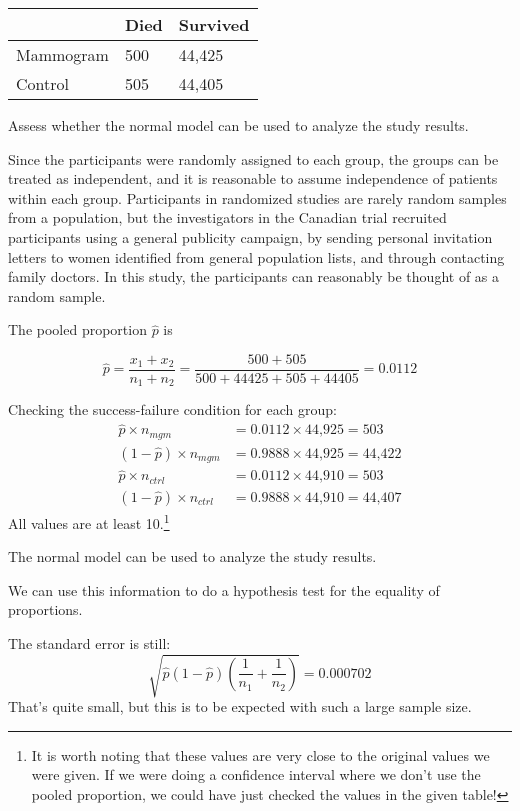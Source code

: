 \documentclass[
  letterpaper,
  DIV=11,
  numbers=noendperiod]{scrreprt}
\begin{document}
\begin{longtable}[]{@{}lll@{}}
\toprule\noalign{}
& Died & Survived \\
\midrule\noalign{}
\endhead
\bottomrule\noalign{}
\endlastfoot
Mammogram & 500 & 44,425 \\
Control & 505 & 44,405 \\
\end{longtable}

Assess whether the normal model can be used to analyze the study
results.

Since the participants were randomly assigned to each group, the groups
can be treated as independent, and it is reasonable to assume
independence of patients within each group. Participants in randomized
studies are rarely random samples from a population, but the
investigators in the Canadian trial recruited participants using a
general publicity campaign, by sending personal invitation letters to
women identified from general population lists, and through contacting
family doctors. In this study, the participants can reasonably be
thought of as a random sample.

The pooled proportion \(\hat{p}\) is

\[
\hat{p} = \dfrac{x_{1} + x_{2}}{n_{1} + n_{2}} = \dfrac{500 + 505}{500 + 44425 + 505 + 44405} = 0.0112
\]

Checking the success-failure condition for each group: \begin{align*}
\hat{p} \times n_{mgm} &= 0.0112 \times \text{44,925} = 503\\
(1 - \hat{p}) \times n_{mgm} &= 0.9888 \times \text{44,925} = \text{44,422} \\
\hat{p} \times n_{ctrl} &= 0.0112 \times \text{44,910} = 503\\
(1 - \hat{p}) \times n_{ctrl} &= 0.9888 \times \text{44,910} = \text{44,407}
\end{align*} All values are at least 10.\footnote{It is worth noting
  that these values are very close to the original values we were given.
  If we were doing a confidence interval where we don't use the pooled
  proportion, we could have just checked the values in the given table!}

The normal model can be used to analyze the study results.

We can use this information to do a hypothesis test for the equality of
proportions.

The standard error is still: \[
\sqrt{\hat p(1 - \hat p)\left(\frac{1}{n_1} + \frac{1}{n_2}\right)} = 0.000702
\] That's quite small, but this is to be expected with such a large
sample size.
\end{document}
